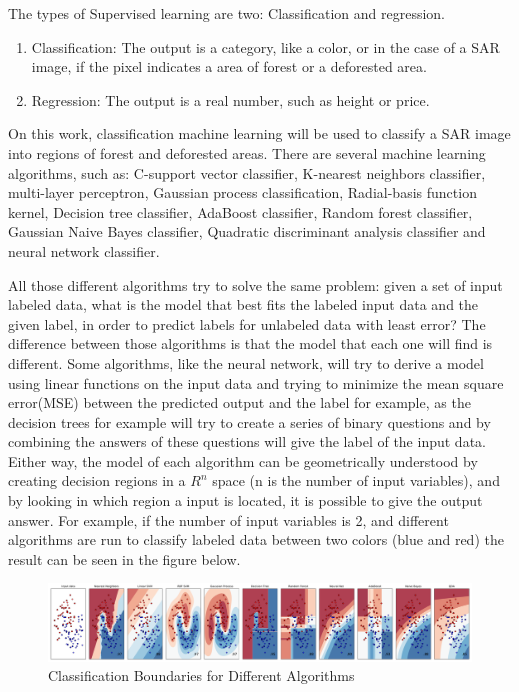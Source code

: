 The types of Supervised learning are two: Classification and regression.
\begin{enumerate}
    \item Classification: The output is a category, like a color, or in the case of a SAR image, if the pixel indicates a area of forest or a deforested area.
    \item Regression: The output is a real number, such as height or price.
\end{enumerate}{}

On this work, classification machine learning will be used to classify a SAR image into regions of forest and deforested areas. \newline
There are several machine learning algorithms, such as: C-support vector classifier, K-nearest neighbors classifier, multi-layer perceptron, Gaussian process classification, Radial-basis function kernel, Decision tree classifier, AdaBoost classifier, Random forest classifier, Gaussian Naive Bayes classifier, Quadratic discriminant analysis classifier and neural network classifier.\newline

All those different algorithms try to solve the same problem: given a set of input labeled data, what is the model that best fits the labeled input data and the given label, in order to predict labels for unlabeled data with least error?\newline
The difference between those algorithms is that the model that each one will find is different. Some algorithms, like the neural network, will try to derive a model using linear functions on the input data and trying to minimize the mean square error(MSE) between the predicted output and the label for example, as the decision trees for example will try to create a series of binary questions and by combining the answers of these questions will give the label of the input data.
\newline
Either way, the model of each algorithm can be geometrically understood by creating decision regions in a $R^n$ space (n is the number of input variables), and by looking in which region a input is located, it is possible to give the output answer.
\newline
For example, if the number of input variables is 2, and different algorithms are run to classify labeled data between two colors (blue and red) the result can be seen in the figure below.

\begin{figure}[H]
    \centering
    \includegraphics[width=\linewidth]{Chapter3/regions.pdf}
    \caption{Classification Boundaries for Different Algorithms}
    \label{fig:machine_learning_classification}
\end{figure}{}

